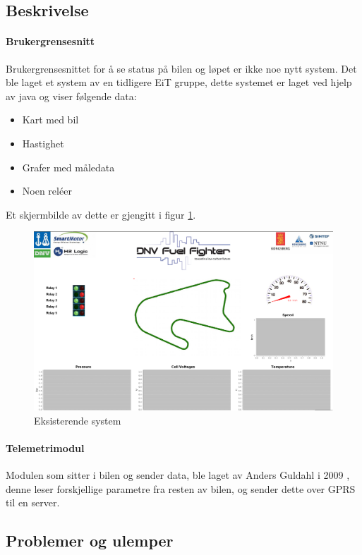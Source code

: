 \subsection{Beskrivelse}

\paragraph{Brukergrensesnitt}
Brukergrensesnittet for å se status på bilen og løpet er ikke noe nytt system. 
Det ble laget et system av en tidligere EiT gruppe, dette systemet er laget ved hjelp av java og viser følgende data:
\begin{itemize}
\item Kart med bil
\item Hastighet
\item Grafer med måledata
\item Noen reléer
\end{itemize}
Et skjermbilde av dette er gjengitt i figur \ref{fig:gammeljava}.

\begin{figure}[H]
\includegraphics[width=\textwidth]{images/java.png}
\caption{Eksisterende system}
\label{fig:gammeljava}
\end{figure}

\paragraph{Telemetrimodul}
Modulen som sitter i bilen og sender data, ble laget av Anders Guldahl i 2009 \cite{telemetrithesis}, denne leser forskjellige parametre fra resten av bilen, og sender dette over GPRS til en server.

\subsection{Problemer og ulemper}
